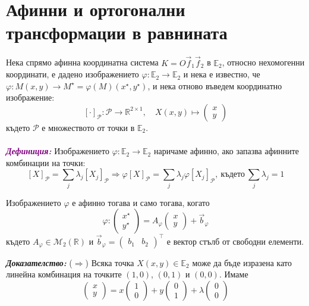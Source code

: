 \documentclass[12pt]{article}
\begin{document}
\part{Афинни и ортогонални трансформации в равнината}
Нека спрямо афинна координатна система $K=O\vec{f}_1\vec{f}_2$ в $\mathbb{E}_2$, относно нехомогенни координати, е дадено изображението $\varphi:\mathbb{E}_2\to\mathbb{E}_2$ и нека е известно, че $\varphi:M(x,y)\to M^\star=\varphi(M)(x^\star, y^\star)$, и нека отново въведем координатно изображение: $$[\cdot]_{\mathcal P} : \mathcal P \to \mathbb{R}^{2\times 1},\quad 
X(x,y) \mapsto \begin{pmatrix} x \\ y\end{pmatrix}$$
където $\mathcal P$ е множеството от точки в $\mathbb{E}_2$.
\\
\\
\textbf{\textit{\textcolor{purple}{Дефиниция:}}} Изображението $\varphi:\mathbb{E}_2\to\mathbb{E}_2$ наричаме афинно, ако запазва афинните комбинации на точки:
$$[X]_{\mathcal P}=\sum_j \lambda_j [X_j]_{\mathcal P}\Rightarrow\varphi[X]_{\mathcal P}=\sum_j \lambda_j \varphi[X_j]_{\mathcal P},\ \text{където}\ \sum_j \lambda_j=1$$
\begin{tcolorbox}[
    colback=blue!5,    %
    colframe=blue!75!black, %
    title={\textbf{Твърдение 13:}}, %
    fonttitle=\bfseries,
    boxrule=0.8pt,
    arc=1mm,           %
    top=2mm, bottom=2mm, left=3mm, right=3mm
] Изображението $\varphi$ е афинно тогава и само тогава, когато $$\varphi:\begin{pmatrix} x^\star \\ y^{\star}\end{pmatrix}=A_\varphi\begin{pmatrix} x \\ y\end{pmatrix}+\vec{b}_{\varphi}$$ където $A_\varphi\in \mathcal M_2(\mathbb{R})$ и $\vec{b}_{\varphi}=\begin{pmatrix} b_1& b_2\end{pmatrix}^\top$ е вектор стълб от свободни елементи.
\end{tcolorbox}
\textbf{\textit{Доказателство:}} ($\Rightarrow$) Всяка точка $X(x,y)\in\mathbb{E}_2$ може да бъде изразена като линейна комбинация на точките $(1,0)$, $(0,1)$ и $(0,0)$. Имаме $$\begin{pmatrix}x \\ y\end{pmatrix}=x\begin{pmatrix}1 \\0\end{pmatrix}+y\begin{pmatrix}0\\1\end{pmatrix}+\lambda\begin{pmatrix}0\\ 0\end{pmatrix}$$
\end{document}

